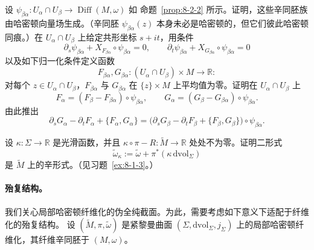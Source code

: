 \begin{exercise}\label{ex:8-2-4}
设 $\psi_{\beta\alpha}:U_\alpha\cap U_\beta\to\operatorname{Diff}(M,\omega)$ 如
命题~\ref{prop:8-2-2} 所示。证明，这些辛同胚族由哈密顿向量场生成。（辛同胚
$\psi_{\beta\alpha}(z)$ 本身未必是哈密顿的，但它们彼此哈密顿同痕。）在
$U_\alpha\cap U_\beta$ 上给定共形坐标 $s+it$，用条件
\[
  \partial_s\psi_{\beta\alpha}
  +X_{F_{\beta\alpha}}\circ\psi_{\beta\alpha}=0,
  \qquad
  \partial_t\psi_{\beta\alpha}
  +X_{G_{\beta\alpha}}\circ\psi_{\beta\alpha}=0
\]
以及如下归一化条件定义函数
\[
  F_{\beta\alpha},G_{\beta\alpha}:
  (U_\alpha\cap U_\beta)\times M\longrightarrow\mathbb R:
\]
对每个 $z\in U_\alpha\cap U_\beta$，$F_{\beta\alpha}$ 与 $G_{\beta\alpha}$ 在
$\{z\}\times M$ 上平均值为零。证明在 $U_\alpha\cap U_\beta$ 上
\[
  F_\alpha=(F_\beta-F_{\beta\alpha})\circ\psi_{\beta\alpha},
  \qquad
  G_\alpha=(G_\beta-G_{\beta\alpha})\circ\psi_{\beta\alpha}.
\]
由此推出
\[
  \partial_sG_\alpha-\partial_tF_\alpha+\{F_\alpha,G_\alpha\}
  =\bigl(\partial_sG_\beta-\partial_tF_\beta+\{F_\beta,G_\beta\}\bigr)
   \circ\psi_{\beta\alpha}.
\]
\end{exercise}

\begin{exercise}\label{ex:8-2-5}
设 $\kappa:\Sigma\to\mathbb R$ 是光滑函数，并且
$\kappa\circ\pi-R:\widetilde M\to\mathbb R$ 处处不为零。证明二形式
\[
  \widetilde\omega_\kappa
  :=\widetilde\omega+\pi^*(\kappa\,\mathrm{dvol}_\Sigma)
\]
是 $\widetilde M$ 上的辛形式。（见习题~\ref{ex:8-1-3}。）
\end{exercise}

\paragraph{殆复结构。}
我们关心局部哈密顿纤维化的伪全纯截面。为此，需要考虑如下意义下适配于纤维化的殆复结构。
设 $(\widetilde M,\pi,\widetilde\omega)$ 是紧黎曼曲面
$(\Sigma,\mathrm{dvol}_\Sigma,j_\Sigma)$ 上的局部哈密顿纤维化，其纤维辛同胚于
$(M,\omega)$。

